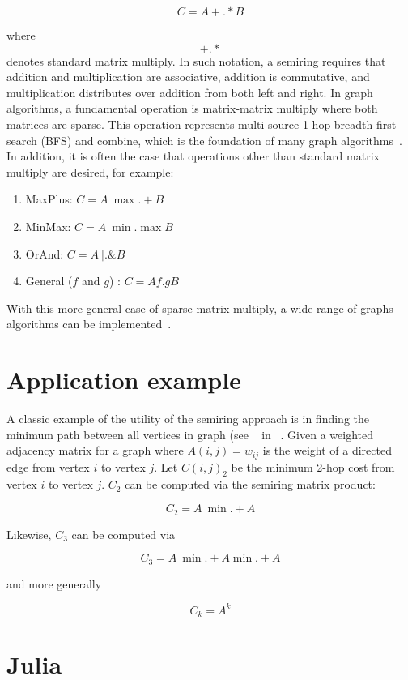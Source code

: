 \documentclass[conference]{IEEEtran}
\begin{document}
$$C = A +.* B$$

where $$+.*$$ denotes standard matrix multiply.  In such notation, a
semiring requires that addition and multiplication are associative,
addition is commutative, and multiplication distributes over addition
from both left and right.  In graph algorithms, a fundamental
operation is matrix-matrix multiply where both matrices are sparse.
This operation represents multi source 1-hop breadth first search
(BFS) and combine, which is the foundation of many graph
algorithms~\cite{shahgilbert}.  In addition, it is often the case that
operations other than standard matrix multiply are desired, for
example:

\begin{enumerate}
\item MaxPlus: $C = A \ {\max.+} B$
\item MinMax: $C = A \ \min.\max B$
\item OrAnd: $C = A \ |.\& B $
\item General ($f$ and $g$) : $C = A f.g B $
\end{enumerate}

With this more general case of sparse matrix multiply, a wide range of
graphs algorithms can be implemented~\cite{KepnerGilbertBook}.

\section{Application example}

A classic example of the utility of the semiring approach is in
finding the minimum path between all vertices in graph (see
~\cite{Rader} in ~\cite{KepnerGilbertBook}.  Given a weighted
adjacency matrix for a graph where $A(i,j) = w_{ij}$ is the weight of
a directed edge from vertex $i$ to vertex $j$.  Let $C(i,j)_2$ be the
minimum 2-hop cost from vertex $i$ to vertex $j$.
$C_2$ can be computed via the semiring matrix product:

$$C_2 = A \ \min.+ A$$

Likewise, $C_3$ can be computed via

$$C_3 = A\  \min.+ A \min.+ A$$

and more generally

$$C_k = A^k$$

\section{Julia}
\end{document}
